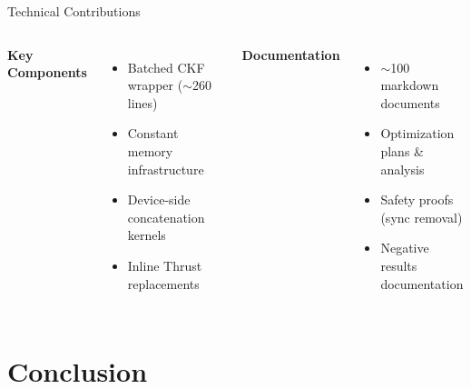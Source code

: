 \documentclass[aspectratio=169, table]{beamer}
\begin{document}
\begin{frame}{Technical Contributions}
\vspace{0.3em}
\begin{columns}
\textbf{Key Components}
\begin{itemize}
    \item Batched CKF wrapper ($\sim$260 lines)
    \item Constant memory infrastructure
    \item Device-side concatenation kernels
    \item Inline Thrust replacements
\end{itemize}

\textbf{Documentation}
\begin{itemize}
    \item $\sim$100 markdown documents
    \item Optimization plans \& analysis
    \item Safety proofs (sync removal)
    \item Negative results documentation
\end{itemize}
\end{columns}
\end{frame}

\section{Conclusion}
\end{document}
